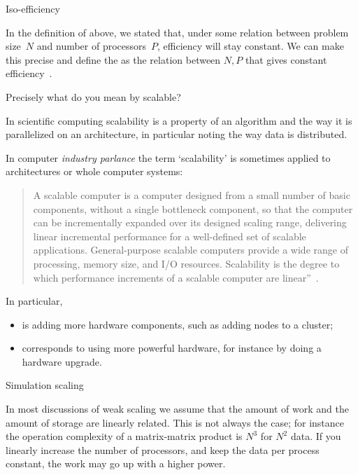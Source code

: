  {Iso-efficiency}
\label{sec:iso-efficiency}

In the definition of  above, we stated
that, under some relation between problem size~$N$ and number of
processors~$P$, efficiency will stay constant. We can make this
precise and define the  as the
relation between $N,P$ that gives constant
efficiency~\cite{Grama:1993:isoefficiency}.

 {Precisely what do you mean by scalable?}

In scientific computing
scalability is a property of an algorithm and the way it is
parallelized on an architecture, in
particular noting the way data is distributed.

In computer
\emph{industry parlance}
the term `scalability' is sometimes
applied to architectures or whole computer systems:
\begin{quotation}
  A
  scalable computer is a computer designed from a small number of
  basic components, without a single bottleneck component, so that
  the computer can be incrementally expanded over its designed scaling
  range, delivering linear incremental performance for a well-defined
  set of scalable applications.  General-purpose scalable computers
  provide a wide range of processing, memory size, and I/O
  resources.  Scalability is the degree to which performance
  increments of a scalable computer are linear''~\cite{Bell:outlook}.
\end{quotation}

In particular,
\begin{itemize}
\item {} is adding more hardware components,
  such as adding nodes to a cluster;
\item {} corresponds to using more powerful
  hardware, for instance by doing a hardware upgrade.
\end{itemize}

 {Simulation scaling}

In most discussions of weak scaling
we assume that the amount of work and 
the amount of storage are linearly related. This is not always the case; for instance
the operation complexity of a matrix-matrix product is $N^3$ for $N^2$ data.
If you linearly increase the number of processors, and keep the data
per process constant, the work may go up with a higher power.

